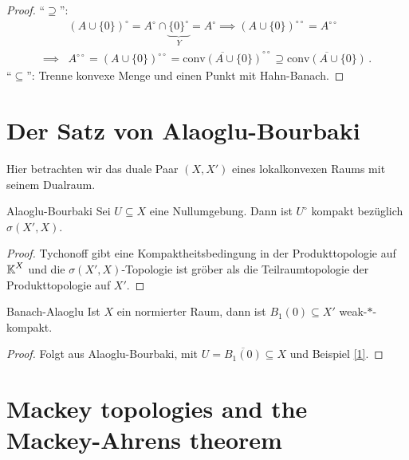 \documentclass{article}
\begin{document}
	\begin{proof}
		\enquote{$\supseteq$}:
		\begin{align*}
		&(A\cup\{0\})^{\circ}=A^{\circ}\cap\underbrace{\{0\}^{\circ}}_{Y}=A^{\circ}\implies (A\cup\{0\})^{\circ\circ}=A^{\circ\circ}\\
		\implies&
		A^{\circ\circ}=(A\cup \{0\})^{\circ\circ}=\overline{\mathrm{conv}(A\cup \{0\})}^{\circ\circ}\supseteq \overline{\mathrm{conv}(A\cup \{0\})}\,.\end{align*}
		\enquote{$\subseteq$}: Trenne konvexe Menge und einen Punkt mit Hahn-Banach.		
	\end{proof}
	
	
	\section{Der Satz von Alaoglu-Bourbaki}
	
	Hier betrachten wir das duale Paar $(X,X')$ eines lokalkonvexen Raums mit seinem Dualraum.
	
	\begin{Satz}{Alaoglu-Bourbaki}{}
		Sei $U\subseteq X$ eine Nullumgebung. Dann ist $U^{\circ}$ kompakt bezüglich $\sigma(X',X)$.
	\end{Satz}
	
	\begin{proof}
		Tychonoff gibt eine Kompaktheitsbedingung in der Produkttopologie auf $\operatorname{\mathbb K}^X$ und die $\sigma(X',X)$-Topologie ist gröber als die Teilraumtopologie der Produkttopologie auf $X'$.
		\end{proof}
	
	\begin{Kor}{Banach-Alaoglu}{}
		Ist $X$ ein normierter Raum, dann ist $B_1(0)\subseteq X'$ weak-$*$-kompakt.
	\end{Kor}
	
	\begin{proof}
		Folgt aus Alaoglu-Bourbaki, mit $U=\overline{B_1(0)}\subseteq X$ und Beispiel \ref{1}.
	\end{proof}
	
	
	\section{Mackey topologies and the Mackey-Ahrens theorem}
	
\end{document}
